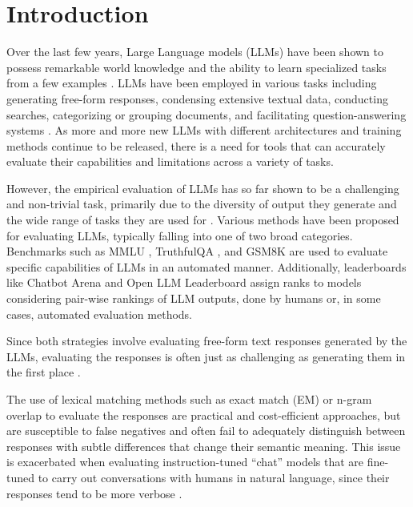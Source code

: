 \section {Introduction} \label{sec:intro}


Over the last few years, Large Language models (LLMs) have been shown to possess remarkable world knowledge \citep{petroni2019language, razeghi2022impact} and the ability to learn specialized tasks from a few examples \citep{brown2020language}. 
LLMs have been employed in various tasks including generating free-form responses, condensing extensive textual data, conducting searches, categorizing or grouping documents, and facilitating question-answering systems \citep{vectara_llm_use_cases}. 
As more and more new LLMs with different architectures and training methods continue to be released, there is a need for tools that can accurately evaluate their capabilities and limitations across a variety of tasks. 

However, the empirical evaluation of LLMs has so far shown to be a challenging and non-trivial task, primarily due to the diversity of output they generate and the wide range of tasks they are used for \citep{Zhang2024LLMEval, li2023generative}. 
Various methods have been proposed for evaluating LLMs, typically falling into one of two broad categories. 
Benchmarks such as MMLU \citep{mmlu}, TruthfulQA \citep{lin2021truthfulqa}, and GSM8K \citep{cobbe2021training} are used to evaluate specific capabilities of LLMs in an automated manner. 
Additionally, leaderboards like Chatbot Arena \citep{chiang2024chatbot} and Open LLM Leaderboard \citep{open-llm-leaderboard} assign ranks to models considering pair-wise rankings of LLM outputs, done by humans or, in some cases, automated evaluation methods.

Since both strategies involve evaluating free-form text responses generated by the LLMs, evaluating the responses is often just as challenging as generating them in the first place \citep[see e.g.][]{chang2023survey}. 


The use of lexical matching methods such as exact match (EM) or n-gram overlap to evaluate the responses are practical and cost-efficient approaches, but are susceptible to false negatives and often fail to adequately distinguish between responses with subtle differences that change their semantic meaning.
%
This issue is exacerbated when evaluating instruction-tuned ``chat'' models that are fine-tuned to carry out conversations with humans in natural language, since their responses tend to be more verbose \citep{saito2023verbosity, renze2024benefits}. 

